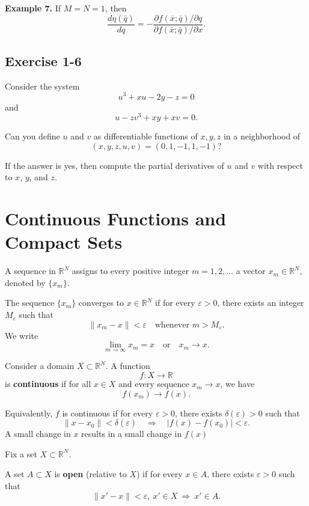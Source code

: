 \textbf{Example 7.}  
If $M=N=1$, then
\[
\frac{d\eta(\bar q)}{dq}
=
-\frac{\partial f(\bar x;\bar q)/\partial q}{\partial f(\bar x;\bar q)/\partial x}.
\]

\begin{tcolorbox}[breakable]

\subsection*{Exercise 1-6}

Consider the system
\[
u^3 + xu - 2y - z = 0
\]
and
\[
u - zv^3 + xy + xv = 0.
\]

Can you define $u$ and $v$ as differentiable functions of $x,y,z$
in a neighborhood of
\[
(x,y,z,u,v)=(0,1,-1,1,-1)?
\]

If the answer is yes, then compute the partial derivatives of
$u$ and $v$ with respect to $x$, $y$, and $z$.

\end{tcolorbox}


\section{Continuous Functions and Compact Sets}

A sequence in $\mathbb{R}^N$ assigns to every positive integer $m=1,2,\dots$
a vector $x_m \in \mathbb{R}^N$, denoted by $\{x_m\}$.

\medskip

The sequence $\{x_m\}$ converges to $x \in \mathbb{R}^N$ if for every $\varepsilon>0$,
there exists an integer $M_\varepsilon$ such that
\[
\|x_m - x\| < \varepsilon
\quad \text{whenever } m > M_\varepsilon.
\]
We write
\[
\lim_{m\to\infty} x_m = x
\quad \text{or} \quad x_m \to x.
\]

\medskip

Consider a domain $X \subset \mathbb{R}^N$. A function
\[
f : X \to \mathbb{R}
\]
is \textbf{continuous} if for all $x \in X$ and every sequence $x_m \to x$,
we have
\[
f(x_m) \to f(x).
\]

Equivalently, $f$ is continuous if for every $\varepsilon>0$, there exists
$\delta(\varepsilon)>0$ such that
\[
\|x - x_0\| < \delta(\varepsilon)
\quad \Rightarrow \quad
|f(x) - f(x_0)| < \varepsilon.
\]
A small change in $x$ results in a small change in $f(x)$


\medskip

Fix a set $X \subset \mathbb{R}^N$.

A set $A \subset X$ is \textbf{open} (relative to $X$) if for every $x \in A$,
there exists $\varepsilon>0$ such that
\[
\|x' - x\| < \varepsilon, \ x' \in X \ \Rightarrow \ x' \in A.
\]

